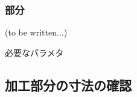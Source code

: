 \subsubsection{\IncutBoringMilling 部分\TBW}
(to be written...)
\begin{Parameter}{必要なパラメタ}
\PMIncutBoringExists%
\end{Parameter}


\clearpage
\subsection{加工部分の寸法の確認}

